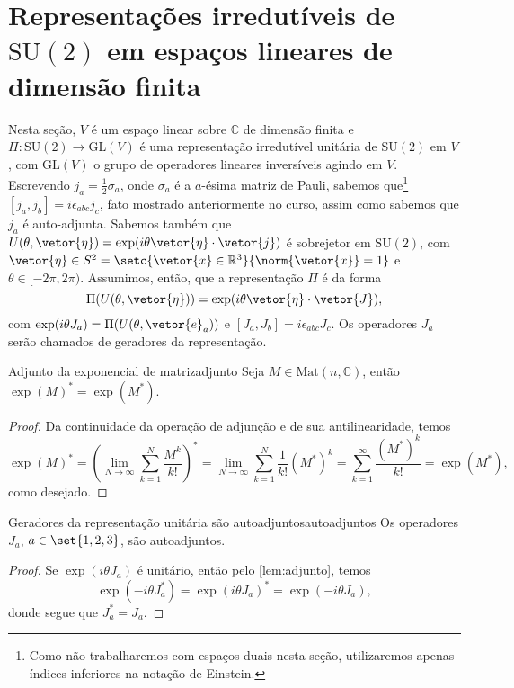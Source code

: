\section[Representações unitárias e irredutíveis de SU(2) em espaços lineares de dimensão finita]{Representações irredutíveis de \(\mathrm{SU}(2)\) em espaços lineares de dimensão finita}
Nesta seção, \(V\) é um espaço linear sobre \(\mathbb{C}\) de dimensão finita e \(\Pi : \mathrm{SU}(2) \to \mathrm{GL}(V)\) é uma representação irredutível unitária de \(\mathrm{SU}(2)\) em \(V\), com \(\mathrm{GL}(V)\) o grupo de operadores lineares inversíveis agindo em \(V\). Escrevendo \(j_a = \frac12 \sigma_a\), onde \(\sigma_a\) é a \(a\)-ésima matriz de Pauli, sabemos que\footnote{Como não trabalharemos com espaços duais nesta seção, utilizaremos apenas índices inferiores na notação de Einstein.} \([j_a, j_b] = i \epsilon_{abc} j_c\), fato mostrado anteriormente no curso, assim como sabemos que \(j_a\) é auto-adjunta. Sabemos também que \(U(\theta, \vetor{\eta}) = \exp(i \theta \vetor{\eta}\cdot \vetor{j})\) é sobrejetor em \(\mathrm{SU}(2)\), com \(\vetor{\eta} \in S^2 = \setc{\vetor{x} \in \mathbb{R}^3}{\norm{\vetor{x}} = 1}\) e \(\theta \in [-2\pi, 2\pi)\). Assumimos, então, que a representação \(\Pi\) é da forma
\begin{equation*}
    \Pi(U(\theta, \vetor{\eta})) = \exp(i\theta \vetor{\eta}\cdot\vetor{J}),
\end{equation*}
com \(\exp(i \theta J_a) = \Pi(U(\theta, \vetor{e}_a))\) e \([J_a, J_b] = i \epsilon_{abc} J_c\). Os operadores \(J_a\) serão chamados de geradores da representação.

\begin{lemma}{Adjunto da exponencial de matriz}{adjunto}
    Seja \(M \in \mathrm{Mat}(n, \mathbb{C})\), então \(\exp(M)^* = \exp(M^*)\).
\end{lemma}
\begin{proof}
    Da continuidade da operação de adjunção e de sua antilinearidade, temos
    \begin{equation*}
        \exp(M)^* = \left(\lim_{N\to \infty}\sum_{k = 1}^N \frac{M^k}{k!}\right)^* = \lim_{N\to \infty} \sum_{k = 1}^N \frac{1}{k!} (M^*)^k = \sum_{k = 1}^\infty \frac{(M^*)^k}{k!} = \exp(M^*),
    \end{equation*}
    como desejado.
\end{proof}

\begin{proposition}{Geradores da representação unitária são autoadjuntos}{autoadjuntos}
    Os operadores \(J_a\), \(a \in \set{1,2,3}\), são autoadjuntos.
\end{proposition}
\begin{proof}
    Se \(\exp(i \theta J_a)\) é unitário, então pelo \cref{lem:adjunto}, temos
    \begin{equation*}
        \exp(-i\theta J_a^*) = \exp(i\theta J_a)^* = \exp(-i\theta J_a),
    \end{equation*}
    donde segue que \(J_a^* = J_a\).
\end{proof}


